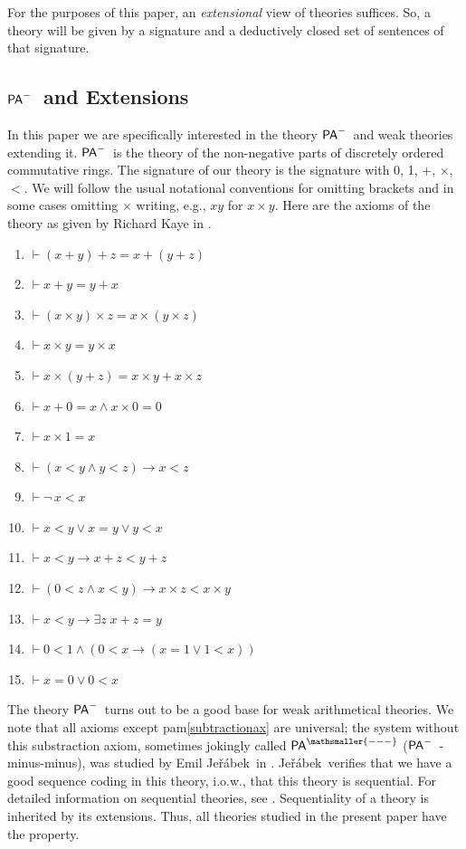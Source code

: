 \documentclass{amsart}
\newcommand{\pam}{\ensuremath{{\sf PA}^{-}}}
\newcommand{\jer}{Je\v{r}\'abek}
\begin{document}
For the purposes of this paper, an \emph{extensional} view of theories suffices. 
So, a theory will be given by a signature and a deductively closed set of sentences of that
signature.

\subsection{\pam\ and Extensions}\label{pamandextensions}
In this paper we are specifically interested in the theory \pam\ and weak theories extending it. \pam\ is the theory of the non-negative parts of discretely ordered
commutative rings. The signature of our theory is the signature with 0, 1, $+$, $\times$, $<$. We will follow the usual notational conventions for omitting brackets and in some cases
omitting $\times$ writing, e.g., $xy$ for $x\times y$.
Here are the axioms of the theory as given by Richard Kaye in \cite[Chapter 2.1]{kaye:mode91}.

\begin{enumerate}[{\sf pam}1.]
    \item 
    $\vdash (x+y)+z= x+(y+z)$
    \item $\vdash x+y = y+x$
    \item $\vdash (x\times y)\times z = x\times (y \times z)$
    \item $\vdash x\times y = y \times x$
    \item $\vdash x \times (y+z) = x\times y + x\times z$
    \item $\vdash x+0=x \wedge x\times 0 = 0$
    \item $\vdash x\times 1 = x$
    \item $\vdash (x< y \wedge y < z) \to x< z $
    \item $\vdash \neg\, x< x$
    \item $\vdash x<y \vee x=y \vee y<x$
    \item $\vdash x< y \to x+z< y+z$
    \item $\vdash (0<z \wedge x<y) \to x\times z < x\times y$
    \item \label{subtractionax} $\vdash x< y \to \exists z\; x+z=y$
    \item $\vdash 0< 1 \wedge (0<x \to (x=1 \vee 1<x))$
    \item $\vdash x=0 \vee 0<x$
\end{enumerate}

The theory \pam\ turns out to be a good base for weak arithmetical theories. We note that all axioms except {\sf pam}\ref{subtractionax} are universal; the system without this substraction axiom, sometimes jokingly called ${\sf PA}^{\mathsmaller{---}}$ (\pam\ -minus-minus), was studied by Emil  \jer\ in \cite{jera:sequ12}.
\jer\ verifies that we have a good sequence coding in this theory, i.o.w., that this
theory is sequential. For detailed information on sequential
theories, see \cite{viss:what13}. Sequentiality of a theory is inherited by its extensions. Thus, all theories studied in the present paper have the property.
\end{document}
